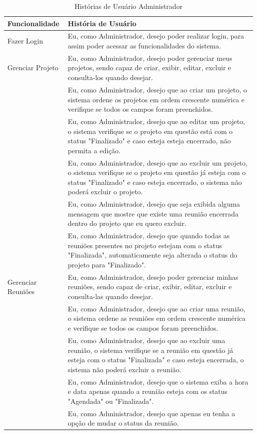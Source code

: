 \begin{table}[H]
	\begin{tabular}{|p{4.0cm}|p{11.0cm}|} 
	\hline
	\textbf{Funcionalidade} & \textbf{História de Usuário} \\ \hline
	Fazer Login & Eu, como Administrador, desejo poder realizar login, para assim poder acessar as funcionalidades do sistema.  \\ \hline
	Grenciar Projeto & Eu, como Administrador, desejo poder gerenciar meus projetos, sendo capaz de criar, exibir, editar, excluir e consulta-los quando desejar. \\ \hline
	 & Eu, como Administrador, desejo que ao criar um projeto, o sistema ordene os projetos em ordem crescente numérica e verifique se todos os campos foram preenchidos. \\ \hline
	 & Eu, como Administrador, desejo que ao editar um projeto, o sistema verifique se o projeto em questão está com o status "Finalizado" e caso esteja esteja encerrado, não permita a edição. \\ \hline
	 & Eu, como Administrador, desejo que ao excluir um projeto, o sistema verifique se o projeto em questão já esteja com o status "Finalizado" e caso esteja encerrado, o sistema não poderá excluir o projeto. \\ \hline
	 & Eu, como Administrador, desejo que seja exibida alguma mensagem que mostre que existe uma reunião encerrada dentro do projeto que eu quero excluir. \\ \hline
	 & Eu, como Administrador, desejo que quando todas as reuniões presentes no projeto estejam com o status "Finalizada", automaticamente seja alterada o status do projeto para "Finalizado". \\ \hline
	 Gerenciar Reuniões & Eu, como Administrador, desejo poder gerenciar minhas reuniões, sendo capaz de criar, exibir, editar, excluir e consulta-las quando desejar. \\ \hline
	 & Eu, como Administrador, desejo que ao criar uma reunião, o sistema ordene as reuniões em ordem crescente numérica e verifique se todos os campos foram preenchidos. \\ \hline
	 & Eu, como Administrador, desejo que ao excluir uma reunião, o sistema verifique se a reunião em questão já esteja com o status "Finalizada" e caso esteja encerrada, o sistema não poderá excluir a reunião. \\ \hline
	 & Eu, como Administrador, desejo que o sistema exiba a hora e data apenas quando a reunião esteja com os status "Agendada" ou "Finalizada". \\ \hline
	 & Eu, como Administrador, desejo que apenas eu tenha a opção de mudar o status da reunião. \\ \hline

	\end{tabular}
	 \caption{Histórias de Usuário Administrador}
	 \label{tab:historias_de_usuario_administrador}
\end{table}

